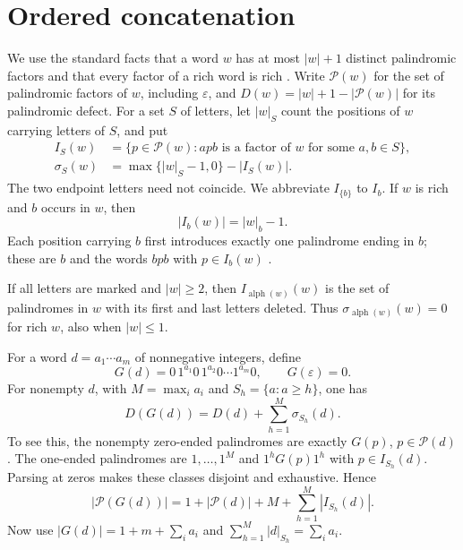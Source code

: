 \documentclass[10pt]{article}
\newcommand{\Pal}{\mathcal P}
\newcommand{\Alphab}{\operatorname{alph}}
\begin{document}
\section{Ordered concatenation}

We use the standard facts that a word $w$ has at most $|w|+1$ distinct
palindromic factors and that every factor of a rich word is rich
\cite[Proposition~2.1 and Corollary~2.5]{GJW}.
Write $\Pal(w)$ for the set of palindromic factors of $w$, including
$\varepsilon$, and $D(w)=|w|+1-|\Pal(w)|$ for its palindromic defect.
For a set $S$ of letters, let $|w|_S$ count the positions of $w$ carrying
letters of $S$, and put
\[
 \begin{aligned}
 I_S(w)&=\{p\in\Pal(w):apb\text{ is a factor of }w
                    \text{ for some }a,b\in S\},\\
 \sigma_S(w)&=\max\{|w|_S-1,0\}-|I_S(w)|.
 \end{aligned}
\]
The two endpoint letters need not coincide. We abbreviate $I_{\{b\}}$
to $I_b$. If $w$ is rich and $b$ occurs in $w$, then
\begin{equation}\label{eq:singleton}
 |I_b(w)|=|w|_b-1.
\end{equation}
Each position carrying $b$ first introduces exactly one palindrome ending
in $b$; these are $b$ and the words $bpb$ with $p\in I_b(w)$
\cite[proof of Proposition~2.7]{GJW}.

If all letters are marked and $|w|\ge2$, then
$I_{\Alphab(w)}(w)$ is the set of palindromes in $w$ with its first and last
letters deleted. Thus $\sigma_{\Alphab(w)}(w)=0$ for rich $w$, also when
$|w|\le1$.

For a word $d=a_1\cdots a_m$ of nonnegative integers, define
\[
 G(d)=0\,1^{a_1}0\,1^{a_2}0\cdots1^{a_m}0,
 \qquad G(\varepsilon)=0.
\]
For nonempty $d$, with $M=\max_i a_i$ and $S_h=\{a:a\ge h\}$, one has
\begin{equation}\label{eq:defect}
 D(G(d))=D(d)+\sum_{h=1}^{M}\sigma_{S_h}(d).
\end{equation}
To see this, the nonempty zero-ended palindromes are exactly $G(p)$,
$p\in\Pal(d)$. The one-ended palindromes are $1,\ldots,1^M$ and
$1^hG(p)1^h$ with $p\in I_{S_h}(d)$. Parsing at zeros makes these
classes disjoint and exhaustive. Hence
\[
 |\Pal(G(d))|=1+|\Pal(d)|+M+\sum_{h=1}^{M}|I_{S_h}(d)|.
\]
Now use $|G(d)|=1+m+\sum_i a_i$ and
$\sum_{h=1}^{M}|d|_{S_h}=\sum_i a_i$.
\end{document}
